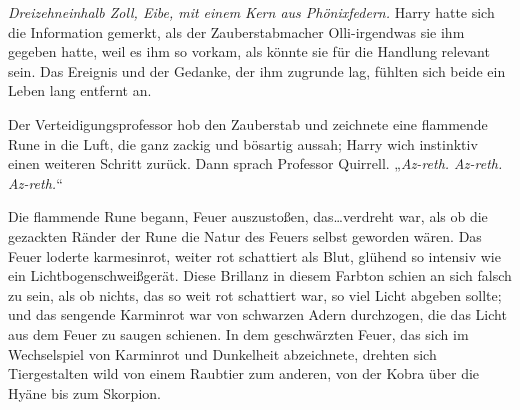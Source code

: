\emph{Dreizehneinhalb Zoll, Eibe, mit einem Kern aus Phönixfedern.}
Harry hatte sich die Information gemerkt, als der Zauberstabmacher Olli-irgendwas sie ihm gegeben hatte, weil es ihm so vorkam, als könnte sie für die Handlung relevant sein. Das Ereignis und der Gedanke, der ihm zugrunde lag, fühlten sich beide ein Leben lang entfernt an.

Der Verteidigungsprofessor hob den Zauberstab und zeichnete eine flammende Rune in die Luft, die ganz zackig und bösartig aussah; Harry wich instinktiv einen weiteren Schritt zurück.
Dann sprach Professor Quirrell.
„\emph{Az-reth. Az-reth. Az-reth.}“

Die flammende Rune begann, Feuer auszustoßen, das…verdreht war, als ob die gezackten Ränder der Rune die Natur des Feuers selbst geworden wären. Das Feuer loderte karmesinrot, weiter rot schattiert als Blut, glühend so intensiv wie ein Lichtbogenschweißgerät. Diese Brillanz in diesem Farbton schien an sich falsch zu sein, als ob nichts, das so weit rot schattiert war, so viel Licht abgeben sollte; und das sengende Karminrot war von schwarzen Adern durchzogen, die das Licht aus dem Feuer zu saugen schienen. In dem geschwärzten Feuer, das sich im Wechselspiel von Karminrot und Dunkelheit abzeichnete, drehten sich Tiergestalten wild von einem Raubtier zum anderen, von der Kobra über die Hyäne bis zum Skorpion.

